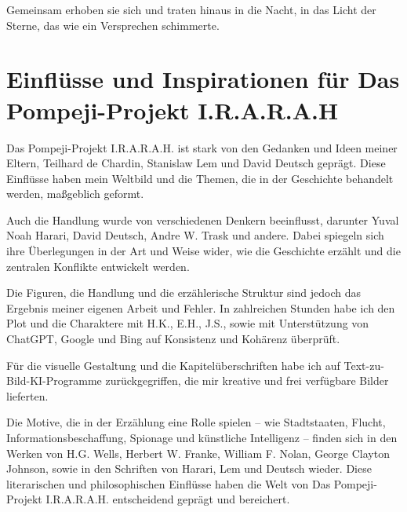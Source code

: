 \documentclass[
]{article}
\begin{document}
Gemeinsam erhoben sie sich und traten hinaus in die Nacht, in das Licht
der Sterne, das wie ein Versprechen schimmerte.

\section{Einflüsse und Inspirationen für Das Pompeji-Projekt
I.R.A.R.A.H}\label{einfluxfcsse-und-inspirationen-fuxfcr-das-pompeji-projekt-i.r.a.r.a.h}

Das Pompeji-Projekt I.R.A.R.A.H. ist stark von den Gedanken und Ideen
meiner Eltern, Teilhard de Chardin, Stanislaw Lem und David Deutsch
geprägt. Diese Einflüsse haben mein Weltbild und die Themen, die in der
Geschichte behandelt werden, maßgeblich geformt.

Auch die Handlung wurde von verschiedenen Denkern beeinflusst, darunter
Yuval Noah Harari, David Deutsch, Andre W. Trask und andere. Dabei
spiegeln sich ihre Überlegungen in der Art und Weise wider, wie die
Geschichte erzählt und die zentralen Konflikte entwickelt werden.

Die Figuren, die Handlung und die erzählerische Struktur sind jedoch das
Ergebnis meiner eigenen Arbeit und Fehler. In zahlreichen Stunden habe
ich den Plot und die Charaktere mit H.K., E.H., J.S., sowie mit
Unterstützung von ChatGPT, Google und Bing auf Konsistenz und Kohärenz
überprüft.

Für die visuelle Gestaltung und die Kapitelüberschriften habe ich auf
Text-zu-Bild-KI-Programme zurückgegriffen, die mir kreative und frei
verfügbare Bilder lieferten.

Die Motive, die in der Erzählung eine Rolle spielen -- wie Stadtstaaten,
Flucht, Informationsbeschaffung, Spionage und künstliche Intelligenz --
finden sich in den Werken von H.G. Wells, Herbert W. Franke, William F.
Nolan, George Clayton Johnson, sowie in den Schriften von Harari, Lem
und Deutsch wieder. Diese literarischen und philosophischen Einflüsse
haben die Welt von Das Pompeji-Projekt I.R.A.R.A.H. entscheidend geprägt
und bereichert.
\end{document}
